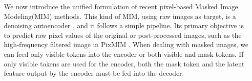 We now introduce the unified formulation of recent pixel-based Masked Image Modeling(MIM) methods. This kind of MIM, using raw images as target, is a denoising autoencoder \cite{denoising}, and it follows a simple pipeline. Its primary objective is to predict raw pixel values of the original or post-processed images, such as the high-frequency filtered image in PixMIM \cite{pixmim}. When dealing with masked images, we can feed only visible tokens into the encoder or both visible and mask tokens. If only visible tokens are used for the encoder, both the mask token and the latent feature output by the encoder must be fed into the decoder. 

